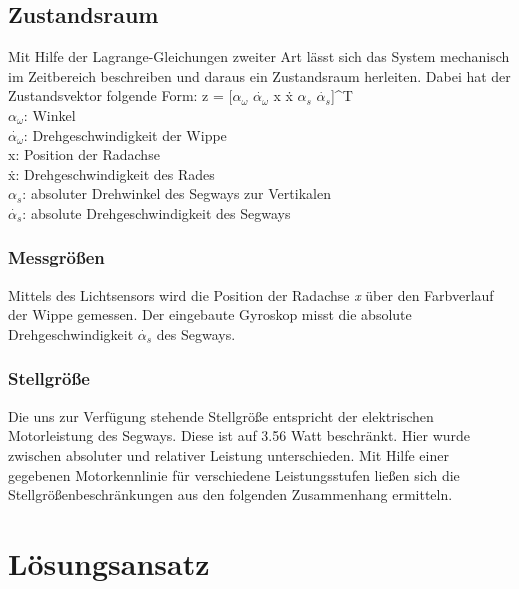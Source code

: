 \documentclass[pdf]{ifacconf}
\begin{document}
	\subsection{Zustandsraum}
	Mit Hilfe der Lagrange-Gleichungen zweiter Art lässt sich das System mechanisch 		im Zeitbereich beschreiben und daraus ein Zustandsraum herleiten.
	Dabei hat der Zustandsvektor folgende Form:
	z = [$\alpha^{}_{\omega}$ $\dot{\alpha^{}_{\omega}}$ x \.{x} $\alpha^{}_{s}$ $\dot{\alpha^{}_{s}}$]^{T} \\
	$\alpha^{}_{\omega}$: Winkel\\
	$\dot{\alpha^{}_{\omega}}$: Drehgeschwindigkeit der Wippe\\
	x:  Position der Radachse\\
	\.{x}:  Drehgeschwindigkeit des Rades\\
	$\alpha^{}_{s}$: absoluter Drehwinkel des Segways zur Vertikalen\\
	$\dot{\alpha^{}_{s}}$: absolute Drehgeschwindigkeit des Segways\\
	
		\subsubsection{Messgrößen}
		Mittels des Lichtsensors wird die Position der Radachse \textit{x} über den 		Farbverlauf der Wippe gemessen. Der eingebaute Gyroskop misst die absolute Drehgeschwindigkeit $\dot{\alpha^{}_{s}}$ des Segways.
		
		\subsubsection{Stellgröße}
		Die uns zur Verfügung stehende Stellgröße entspricht der elektrischen Motorleistung des Segways. Diese ist auf 3.56 Watt beschränkt.
		Hier wurde zwischen absoluter und relativer Leistung unterschieden. Mit Hilfe einer gegebenen Motorkennlinie für verschiedene Leistungsstufen ließen sich die Stellgrößenbeschränkungen aus den folgenden Zusammenhang ermitteln.

	
\section{Lösungsansatz}
\end{document}

